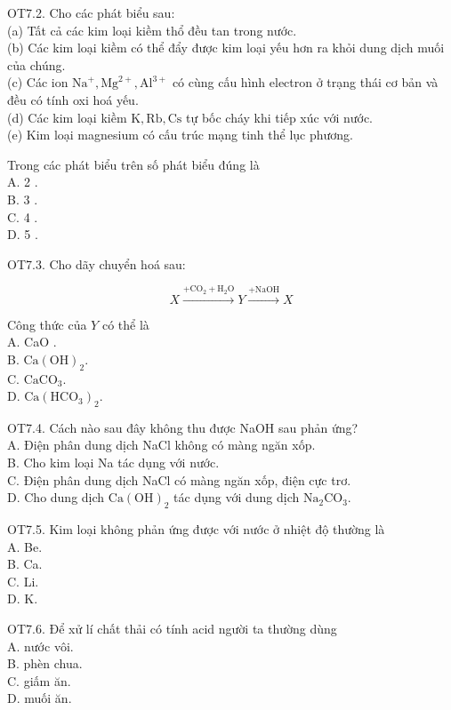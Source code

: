 \documentclass[10pt]{article}
\begin{document}
OT7.2. Cho các phát biểu sau:\\
(a) Tất cả các kim loại kiềm thổ đều tan trong nước.\\
(b) Các kim loại kiềm có thể đẩy được kim loại yếu hơn ra khỏi dung dịch muối của chúng.\\
(c) Các ion $\mathrm{Na}^{+}, \mathrm{Mg}^{2+}, \mathrm{Al}^{3+}$ có cùng cấu hình electron ở trạng thái cơ bản và đều có tính oxi hoá yếu.\\
(d) Các kim loại kiềm $\mathrm{K}, \mathrm{Rb}, \mathrm{Cs}$ tự bốc cháy khi tiếp xúc với nước.\\
(e) Kim loại magnesium có cấu trúc mạng tinh thể lục phương.

Trong các phát biểu trên số phát biểu đúng là\\
A. 2 .\\
B. 3 .\\
C. 4 .\\
D. 5 .

OT7.3. Cho dãy chuyển hoá sau:

$$
X \xrightarrow{+\mathrm{CO}_{2}+\mathrm{H}_{2} \mathrm{O}} Y \xrightarrow{+\mathrm{NaOH}} X
$$

Công thức của $Y$ có thể là\\
A. CaO .\\
B. $\mathrm{Ca}(\mathrm{OH})_{2}$.\\
C. $\mathrm{CaCO}_{3}$.\\
D. $\mathrm{Ca}\left(\mathrm{HCO}_{3}\right)_{2}$.

OT7.4. Cách nào sau đây không thu được NaOH sau phản ứng?\\
A. Điện phân dung dịch NaCl không có màng ngăn xốp.\\
B. Cho kim loại Na tác dụng với nước.\\
C. Điện phân dung dịch NaCl có màng ngăn xốp, điện cực trơ.\\
D. Cho dung dịch $\mathrm{Ca}(\mathrm{OH})_{2}$ tác dụng với dung dịch $\mathrm{Na}_{2} \mathrm{CO}_{3}$.

OT7.5. Kim loại không phản ứng được với nước ở nhiệt độ thường là\\
A. Be.\\
B. Ca.\\
C. Li.\\
D. K.

OT7.6. Để xử lí chất thải có tính acid người ta thường dùng\\
A. nước vôi.\\
B. phèn chua.\\
C. giấm ăn.\\
D. muối ăn.
\end{document}
